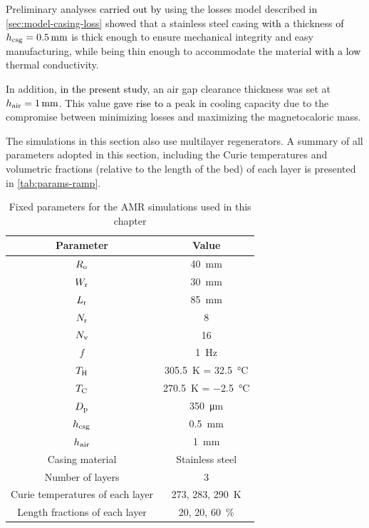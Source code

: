\documentclass[referee]{svjour3}
\begin{document}

Preliminary analyses \textcolor{black}{carried out by} \cite{bib:peixer17-perfor-amrs} using the losses model described in \autoref{sec:model-casing-loss} showed that a stainless steel casing \textcolor{black}{with a} thickness \textcolor{black}{of} $h\ped{csg} = \SI{0.5}{\mm}$ is thick enough to ensure mechanical integrity and easy manufacturing, while being thin enough to accommodate the material \textcolor{black}{with a low} thermal conductivity. 

In addition, \textcolor{black}{in the present study}, an air gap clearance thickness was set at $h\ped{air} = \SI{1}{\mm}$. This value \textcolor{black}{gave rise to a} peak in cooling capacity due to the compromise between minimizing losses and maximizing the magnetocaloric mass.

The simulations in this section also use multilayer regenerators. A summary of all parameters adopted in this section, including the Curie temperatures and volumetric fractions (relative to the length of the bed) of each layer is presented in \autoref{tab:params-ramp}.

\begin{table}[!ht]
  \centering
  \begin{tabular}{c|c}
\hline
    \textbf{Parameter} & \textbf{Value} \\
\hline
$R_{\mathrm{o}}$ & \SI{40}{\mm} \\
$W_{\mathrm{r}}$ & \SI{30}{\mm} \\
$L_{\mathrm{r}}$ & \SI{85}{\mm} \\
$N_{\mathrm{r}}$ & \num{8} \\
$N_{\mathrm{v}}$ & \num{16} \\
$f$ & \SI{1}{\hertz} \\
$T_{\mathrm{H}}$ & \SI{305.5}{\kelvin} = \SI{32.5}{\celsius} \\
$T_{\mathrm{C}}$ & \SI{270.5}{\kelvin} = \SI{-2.5}{\celsius} \\
$D_{\mathrm{p}}$ & \SI{350}{\micro\meter} \\
$h_{\mathrm{csg}}$ & \SI{0.5}{\mm} \\
$h_{\mathrm{air}}$ & \SI{1}{\mm} \\
Casing material & Stainless steel \\
Number of layers & \num{3} \\
Curie temperatures of each layer & \num{273}, \num{283}, \SI{290}{\kelvin} \\ 
Length fractions of each layer & \num{20}, \num{20}, \SI{60}{\percent}\\
\hline
  \end{tabular}
  \caption{Fixed parameters for the AMR simulations used in this chapter}
  \label{tab:params-ramp}
\end{table}
\end{document}
